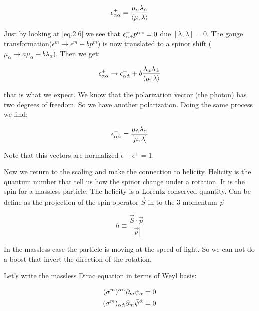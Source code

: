 \begin{equation}
\epsilon^{+}_{\alpha \dot{\alpha}} = \frac{\mu_{\alpha} \bar{\lambda}_{\dot{\alpha}}}{\langle\mu,\lambda \rangle} 
\label{eq.2.6}
\end{equation}

Just by looking at \eqref{eq.2.6} we see that $\epsilon^{+}_{\alpha \dot{\alpha}} p^{\dot{\alpha} \alpha} = 0 $ due $[\lambda,\lambda ] = 0$. The gauge transformation($\epsilon^{m} \rightarrow \epsilon^{m} + bp^{m}$)  is now translated to a spinor shift ($\mu_{\alpha} \rightarrow a\mu_{\alpha} + b\lambda_{\alpha} $). Then we get:

\begin{equation}
\epsilon^{+}_{\alpha \dot{\alpha}} \rightarrow \epsilon^{+}_{\alpha \dot{\alpha}} + b\frac{\lambda_{\alpha}\lambda_{\dot{\alpha}}}{\langle\mu,\lambda \rangle}
\end{equation}

that is what we expect. We know that the polarization vector (the photon) has two degrees of freedom. So we have another polarization. Doing the same process we find:

\begin{equation}
\epsilon^{-}_{\alpha \dot{\alpha}} = \frac{\bar{\mu}_{\dot{\alpha}} \lambda_{\alpha}}{[\mu,\lambda ]} 
\label{eq.2.7}
\end{equation}

Note that this vectors are normalized $\epsilon^{-} \cdot \epsilon^{+} = 1$.

Now we return to the scaling and make the connection to helicity. Helicity is the quantum number that tell us how the spinor change under a rotation. It is the spin for a massless particle. The helicity is a  Lorentz conserved quantity. Can be define as the projection of the spin operator $\vec{S}$ in to the 3-momentum $\vec{p}$


\begin{equation}
h \equiv \frac{\vec{S} \cdot \vec{p}  }{|\vec{p}|}
\end{equation}


In the massless case the particle is moving at the speed of light. So we can not do a boost that invert the direction of the rotation.


Let's write the  massless Dirac equation in terms of Weyl basis:

\begin{align}
(\bar{\sigma}^{m})^{\dot{\alpha} \alpha}\partial_{m} \psi_{\alpha} = 0
\label{eq.2.8}
\\
(\sigma^{m})_{\alpha \dot{\alpha}}\partial_{m} \bar{\psi}^{\dot{\alpha}} = 0
\label{eq.2.9}
\end{align}




